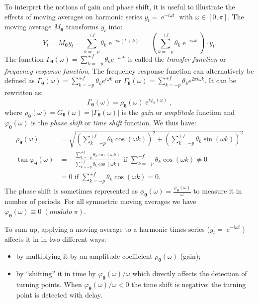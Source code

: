 \documentclass[
]{article}
\DeclareMathOperator{\e}{e}
\newcommand\1{\mathds{1}}
\begin{document}
To interpret the notions of gain and phase shift, it is useful to
illustrate the effects of moving averages on harmonic series
\(y_t=\e^{-i\omega t}\) with \(\omega\in[0,\pi]\). The moving average
\(M_{\boldsymbol\theta}\) transforms \(y_t\) into: \[
Y_t = M_{\boldsymbol\theta}y_t = \sum_{k=-p}^{+f} \theta_k \e^{-i \omega (t+k)}
= \left(\sum_{k=-p}^{+f} \theta_k \e^{-i \omega k}\right)\cdot y_t.
\] The function
\(\Gamma_{\boldsymbol\theta}(\omega)=\sum_{k=-p}^{+f} \theta_k e^{-i \omega k}\)
is called the \emph{transfer function} or \emph{frequency response
function}. The frequency response function can alternatively be defined
as
\(\Gamma_{\boldsymbol\theta}(\omega)=\sum_{k=-p}^{+f} \theta_k e^{i \omega k}\)
or
\(\Gamma_{\boldsymbol\theta}(\omega)=\sum_{k=-p}^{+f} \theta_k e^{2\pi i \omega k}\).
It can be rewritten as: \[
\Gamma_{\boldsymbol\theta}(\omega) = \rho_{\boldsymbol\theta}(\omega)\e^{i\varphi_{\boldsymbol\theta}(\omega)},
\] where
\(\rho_{\boldsymbol\theta}(\omega)=G_{\boldsymbol\theta}(\omega)=\lvert\Gamma_{\boldsymbol\theta}(\omega)\rvert\)
is the \emph{gain} or \emph{amplitude} function and
\(\varphi_{\boldsymbol\theta}(\omega)\) is the \emph{phase shift} or
\emph{time shift} function. We thus have: \begin{align*}
\rho_{\boldsymbol\theta}(\omega) &=\sqrt{\left(\sum_{k=-p}^{+f}\theta_k\cos(\omega k)\right)^2+
\left(\sum_{k=-p}^{+f}\theta_k\sin(\omega k)\right)^2} \\
\tan \varphi_{\boldsymbol\theta}(\omega) &=- \frac{\sum_{k=-p}^{+f}\theta_k\sin(\omega k)}{\sum_{k=-p}^{+f}\theta_k\cos(\omega k)} \text{ if }\sum_{k=-p}^{+f}\theta_k\cos(\omega k) \ne 0 \\
&= 0 \text{ if }\sum_{k=-p}^{+f}\theta_k\cos(\omega k) = 0.
\end{align*} The phase shift is sometimes represented as
\(\phi_{\boldsymbol\theta}(\omega)=\frac{\varphi_{\boldsymbol\theta}(\omega)}{\omega}\)
to measure it in number of periods. For all symmetric moving averages we
have \(\varphi_{\boldsymbol\theta}(\omega)\equiv 0 \;(modulo\;{\pi})\).

To sum up, applying a moving average to a harmonic times series
(\(y_t=\e^{-i\omega t}\)) affects it in in two different ways:

\begin{itemize}
\item
  by multiplying it by an amplitude coefficient
  \(\rho_{\boldsymbol\theta}\left(\omega\right)\) (gain);
\item
  by ``shifting'' it in time by
  \(\varphi_{\boldsymbol\theta}(\omega)/\omega\) which directly affects
  the detection of turning points. When
  \(\varphi_{\boldsymbol\theta}(\omega)/\omega<0\) the time shift is
  negative: the turning point is detected with delay.
\end{itemize}
\end{document}
